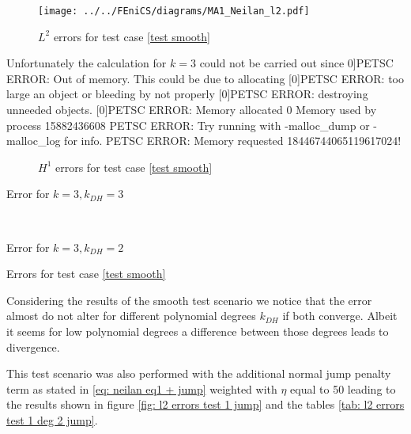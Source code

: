 \begin{figure}[h!]
\centering
	\texttt{[image: ../../FEniCS/diagrams/MA1\_Neilan\_l2.pdf]}
	\caption{$L^2$ errors for test case \ref{test smooth}}
	\label{fig: l2 errors test 1}
\end{figure}
 Unfortunately the calculation for $k=3$ could not be carried out since 
 0]PETSC ERROR: Out of memory. This could be due to allocating
 [0]PETSC ERROR: too large an object or bleeding by not properly
 [0]PETSC ERROR: destroying unneeded objects.
 [0]PETSC ERROR: Memory allocated 0 Memory used by process 15882436608
 PETSC ERROR: Try running with -malloc\_dump or -malloc\_log for info.
 PETSC ERROR: Memory requested 18446744065119617024!
 
\begin{figure}[h!]
\centering
	\caption{$H^1$ errors for test case \ref{test smooth}}
	\label{fig: h2 errors test 1}
\end{figure}

\begin{table}[h]
	\begin{subtable}[b]{0.45\textwidth}
		\centering
    	\caption{Error for $k=3, k_{DH}=3$}
   \end{subtable}
   ~
	\begin{subtable}[b]{0.45\textwidth}
		\centering
 	\caption{Error for $k=3, k_{DH}=2$}
	\end{subtable}
	\caption{Errors for test case \ref{test smooth}}
	\label{tab: l2 errors test 1 deg 2}
\end{table}


Considering the results of the smooth test scenario we notice that the error almost do not alter for different polynomial degrees $k_{DH}$ if both converge. Albeit it seems for low polynomial degrees a difference between those degrees leads to divergence.

This test scenario was also performed with the additional normal jump penalty term as stated in \eqref{eq: neilan eq1 + jump} weighted with $\eta$ equal to 50 leading to the results shown in figure \ref{fig: l2 errors test 1 jump} and the tables \ref{tab: l2 errors test 1 deg 2 jump}.

